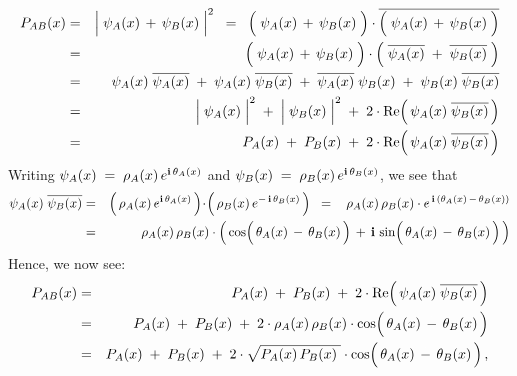 \begin{eqnarray*}
P_{AB}(x)
& = &
    \left\vert\;
        \psi_{A}(x)
        \, \overset{{\color{white}.}}{+} \,
        \psi_{B}(x)
        \;\right\vert^{2}
\;\; = \;\;
    \left(\;
        \psi_{A}(x)
        \, \overset{{\color{white}.}}{+} \,
        \psi_{B}(x)
        \;\right)
    \cdot
    \overline{\left(\;
        \psi_{A}(x)
        \, \overset{{\color{white}.}}{+} \,
        \psi_{B}(x)
        \;\right)}
\\
& = &
    \left(\;
        \psi_{A}(x)
        \, \overset{{\color{white}.}}{+} \,
        \psi_{B}(x)
        \;\right)
    \cdot
    \left(\;
        \overline{\psi_{A}(x)}
        \; \overset{{\color{white}.}}{+} \;
        \overline{\psi_{B}(x)}
        \;\right)
\\
& = &
    \psi_{A}(x)\;\overline{\psi_{A}(x)}
    \; + \;
    \psi_{A}(x)\;\overline{\psi_{B}(x)}
    \; + \;
    \overline{\psi_{A}(x)}\;\psi_{B}(x)
    \; + \;
    \psi_{B}(x)\;\overline{\psi_{B}(x)}
\\
& = &
    \left\vert\;
        \overset{{\color{white}.}}{\psi_{A}(x)}
        \;\right\vert^{2}
    \; + \;
    \left\vert\;
        \overset{{\color{white}.}}{\psi_{B}(x)}
        \;\right\vert^{2}
    \; + \;
    2 \cdot \textnormal{Re}\!\left(\,
        \psi_{A}(x)\;\overline{\psi_{B}(x)}
        \,\right)
\\
& = &
	P_{A}(x)
    \; + \;
	P_{B}(x)
    \; + \;
    2 \cdot \textnormal{Re}\!\left(\,
        \psi_{A}(x)\;\overline{\psi_{B}(x)}
        \,\right)
\end{eqnarray*}
Writing
\;\;$
\psi_{A}(x)
\; = \;
    \rho_{A}(x)\,e^{\mathbf{i}\,\theta_{A}(x)}
$\;
and
\;$
\psi_{B}(x)
\; = \;
    \rho_{B}(x)\,e^{\mathbf{i}\,\theta_{B}(x)}
$,\;\;
we see that
\begin{eqnarray*}
\psi_{A}(x)\;\overline{\psi_{B}(x)}
& = &
    \left(\,
    	\rho_{A}(x)\,e^{\i\,\theta_{A}(x)}
    	\,\right)
    \!\cdot\!
    \left(\,
    	\rho_{B}(x)\,e^{-\,\i\,\theta_{B}(x)}
    	\,\right)
\;\; = \;\;\
    \rho_{A}(x)\,\rho_{B}(x)
    \cdot
    e^{\,\i\,\left(\theta_{A}(x)\,-\,\theta_{B}(x)\right)}
\\
& = &
    \rho_{A}(x)\,\rho_{B}(x)
    \cdot
    \left(\,
        \cos\!\left(\,\theta_{A}(x)\,\overset{{\color{white}.}}{-}\,\theta_{B}(x)\,\right)
        \, + \,
        \i\,
        \sin\!\left(\,\theta_{A}(x)\,\overset{{\color{white}.}}{-}\,\theta_{B}(x)\,\right)
    	\,\right)
\end{eqnarray*}
Hence, we now see:
\begin{eqnarray*}
P_{AB}(x)
& = &
	P_{A}(x)
    \; + \;
	P_{B}(x)
    \; + \;
    2 \cdot \textnormal{Re}\!\left(\,
        \psi_{A}(x)\;\overline{\psi_{B}(x)}
        \,\right)
\\
& = &
	P_{A}(x)
    \; + \;
	P_{B}(x)
    \; + \;
    2 \cdot \rho_{A}(x)\,\rho_{B}(x)
    \cdot
        \cos\!\left(\,\theta_{A}(x)\,\overset{{\color{white}.}}{-}\,\theta_{B}(x)\,\right)
\\
& = &
	P_{A}(x)
    \; + \;
	P_{B}(x)
    \; + \;
    2 \cdot \sqrt{P_{A}(x)\,P_{B}(x){\color{white}.}}
    \cdot
        \cos\!\left(\,\theta_{A}(x)\,\overset{{\color{white}.}}{-}\,\theta_{B}(x)\,\right),
\end{eqnarray*}
